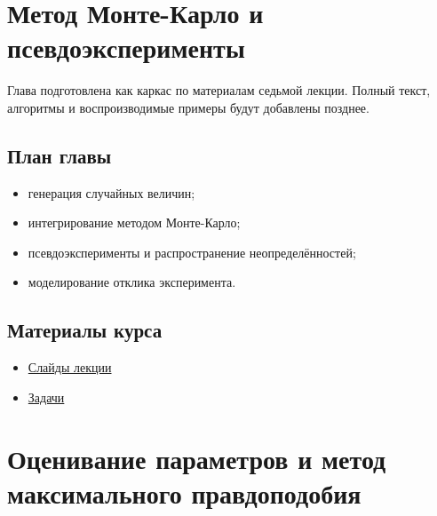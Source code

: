 \documentclass[
  russian,
  12pt,
  a4paper,
  a4paper,
  openany]{scrbook}
\providecommand{\tightlist}{%
  \setlength{\itemsep}{0pt}\setlength{\parskip}{0pt}}
\begin{document}
\chapter{Метод Монте-Карло и
псевдоэксперименты}\label{ux43cux435ux442ux43eux434-ux43cux43eux43dux442ux435-ux43aux430ux440ux43bux43e-ux438-ux43fux441ux435ux432ux434ux43eux44dux43aux441ux43fux435ux440ux438ux43cux435ux43dux442ux44b}

\begin{bookchapteropening}

Глава подготовлена как каркас по материалам седьмой лекции. Полный
текст, алгоритмы и воспроизводимые примеры будут добавлены позднее.

\end{bookchapteropening}

\section{План
главы}\label{ux43fux43bux430ux43d-ux433ux43bux430ux432ux44b-5}

\begin{itemize}
\tightlist
\item
  генерация случайных величин;
\item
  интегрирование методом Монте-Карло;
\item
  псевдоэксперименты и распространение неопределённостей;
\item
  моделирование отклика эксперимента.
\end{itemize}

\section{Материалы
курса}\label{ux43cux430ux442ux435ux440ux438ux430ux43bux44b-ux43aux443ux440ux441ux430-4}

\begin{itemize}
\tightlist
\item
  \href{https://neutrinohit.github.io/statistical-analysis-course/ru/slides/06_monte_carlo_method.html}{Слайды
  лекции}
\item
  \href{https://neutrinohit.github.io/statistical-analysis-course/ru/slides/exercises/06_monte_carlo_method_exercises.html}{Задачи}
\end{itemize}

\chapter{Оценивание параметров и метод максимального
правдоподобия}\label{ux43eux446ux435ux43dux438ux432ux430ux43dux438ux435-ux43fux430ux440ux430ux43cux435ux442ux440ux43eux432-ux438-ux43cux435ux442ux43eux434-ux43cux430ux43aux441ux438ux43cux430ux43bux44cux43dux43eux433ux43e-ux43fux440ux430ux432ux434ux43eux43fux43eux434ux43eux431ux438ux44f}
\end{document}
